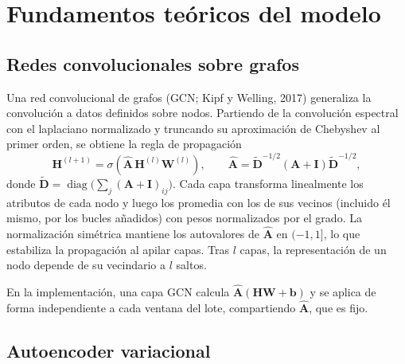 \documentclass[11pt,a4paper]{article}
\newcommand{\A}{\mathbf{A}}
\newcommand{\Ahat}{\hat{\mathbf{A}}}
\DeclareMathOperator{\diag}{diag}
\begin{document}
\section{Fundamentos teóricos del modelo}

\subsection{Redes convolucionales sobre grafos}

Una red convolucional de grafos (GCN; Kipf y Welling, 2017) generaliza la convolución
a datos definidos sobre nodos. Partiendo de la convolución espectral con el
laplaciano normalizado y truncando su aproximación de Chebyshev al primer orden, se
obtiene la regla de propagación
\begin{equation}
\mathbf{H}^{(l+1)} = \sigma\!\left(\Ahat\,\mathbf{H}^{(l)}\mathbf{W}^{(l)}\right),
\qquad
\Ahat = \tilde{\mathbf{D}}^{-1/2}(\A+\mathbf{I})\tilde{\mathbf{D}}^{-1/2},
\label{eq:gcn}
\end{equation}
donde $\tilde{\mathbf{D}}=\diag\big(\sum_j(\A+\mathbf{I})_{ij}\big)$. Cada capa
transforma linealmente los atributos de cada nodo y luego los promedia con los de sus
vecinos (incluido él mismo, por los bucles añadidos) con pesos normalizados por el
grado. La normalización simétrica mantiene los autovalores de $\Ahat$ en $(-1,1]$, lo
que estabiliza la propagación al apilar capas. Tras $l$ capas, la representación de
un nodo depende de su vecindario a $l$ saltos.

En la implementación, una capa GCN calcula
$\Ahat(\mathbf{H}\mathbf{W}+\mathbf{b})$ y se aplica de forma independiente a cada
ventana del lote, compartiendo $\Ahat$, que es fijo.

\subsection{Autoencoder variacional}
\end{document}
